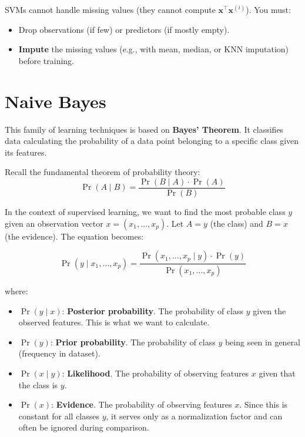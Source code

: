 \begin{warningblock}
    SVMs cannot handle missing values (they cannot compute $\bm{x}^\top \bm{x}^{(i)}$). You must:
    \begin{itemize}
        \item Drop observations (if few) or predictors (if mostly empty).
        \item \textbf{Impute} the missing values (e.g., with mean, median, or KNN imputation) before training.
    \end{itemize}
\end{warningblock}

\section{Naive Bayes}

This family of learning techniques is based on \textbf{Bayes' Theorem}. It classifies data calculating the probability of a data point belonging to a specific class given its features.

\begin{definitionblock}

Recall the fundamental theorem of probability theory:
$$
\Pr(A \mid B) = \frac{\Pr(B \mid A) \cdot \Pr(A)}{\Pr(B)}
$$
\end{definitionblock}

In the context of supervised learning, we want to find the most probable class $y$ given an observation vector $x = (x_1, \dots, x_p)$. Let $A = y$ (the class) and $B = x$ (the evidence). The equation becomes:

$$
\Pr(y \mid x_1, \dots, x_p) = \frac{\Pr(x_1, \dots, x_p \mid y) \cdot \Pr(y)}{\Pr(x_1, \dots, x_p)}
$$

where:
\begin{itemize}
    \item $\Pr(y \mid x)$: \textbf{Posterior probability}. The probability of class $y$ given the observed features. This is what we want to calculate.
    \item $\Pr(y)$: \textbf{Prior probability}. The probability of class $y$ being seen in general (frequency in dataset).
    \item $\Pr(x \mid y)$: \textbf{Likelihood}. The probability of observing features $x$ given that the class is $y$.
    \item $\Pr(x)$: \textbf{Evidence}. The probability of observing features $x$. Since this is constant for all classes $y$, it serves only as a normalization factor and can often be ignored during comparison.
\end{itemize}

